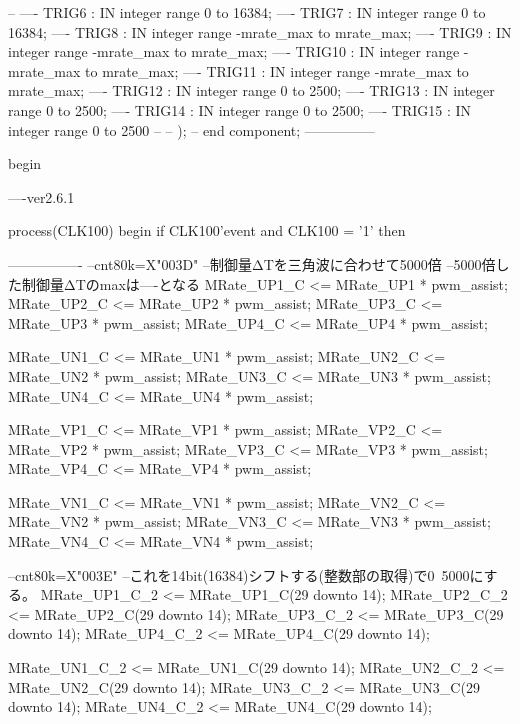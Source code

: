 \begin{mylisting}[language=VHDL,caption=ゲート信号出力モジュール,label=MMC_PWM_GEN_module_VHDL]
--
----			  TRIG6	                           : 	 IN   integer range 0 to 16384; 
----			  TRIG7	                           : 	 IN   integer range 0 to 16384; 
----			  TRIG8	                           : 	 IN   integer range -mrate_max to mrate_max;  
----			  TRIG9	                           : 	 IN   integer range -mrate_max to mrate_max;  
----			  TRIG10	                           : 	 IN   integer range -mrate_max to mrate_max;  
----			  TRIG11	                           : 	 IN   integer range -mrate_max to mrate_max;  
----			  TRIG12	                           :   IN   integer range 0 to 2500;  
----			  TRIG13	                           :   IN   integer range 0 to 2500;  
----			  TRIG14	                           :   IN   integer range 0 to 2500;  
----			  TRIG15	                           :   IN   integer range 0 to 2500
--
--			);
--		end component;
	---------------
	
begin

----ver2.6.1

	process(CLK100)
	begin
		if CLK100'event and CLK100 = '1' then
		
----------------
		--cnt80k=X"003D"
		--制御量ΔTを三角波に合わせて5000倍
		--5000倍した制御量ΔTのmaxは----となる
			MRate_UP1_C <= MRate_UP1 * pwm_assist;
			MRate_UP2_C <= MRate_UP2 * pwm_assist;
			MRate_UP3_C <= MRate_UP3 * pwm_assist;
			MRate_UP4_C <= MRate_UP4 * pwm_assist;
			
			MRate_UN1_C <= MRate_UN1 * pwm_assist;
			MRate_UN2_C <= MRate_UN2 * pwm_assist;
			MRate_UN3_C <= MRate_UN3 * pwm_assist;
			MRate_UN4_C <= MRate_UN4 * pwm_assist;

			MRate_VP1_C <= MRate_VP1 * pwm_assist;
			MRate_VP2_C <= MRate_VP2 * pwm_assist;
			MRate_VP3_C <= MRate_VP3 * pwm_assist;
			MRate_VP4_C <= MRate_VP4 * pwm_assist;
			
			MRate_VN1_C <= MRate_VN1 * pwm_assist;
			MRate_VN2_C <= MRate_VN2 * pwm_assist;
			MRate_VN3_C <= MRate_VN3 * pwm_assist;
			MRate_VN4_C <= MRate_VN4 * pwm_assist;
			
		--cnt80k=X"003E"
		--これを14bit(16384)シフトする(整数部の取得)で0~5000にする。
			MRate_UP1_C_2 <= MRate_UP1_C(29 downto 14);
			MRate_UP2_C_2 <= MRate_UP2_C(29 downto 14);
			MRate_UP3_C_2 <= MRate_UP3_C(29 downto 14);
			MRate_UP4_C_2 <= MRate_UP4_C(29 downto 14);
			
			MRate_UN1_C_2 <= MRate_UN1_C(29 downto 14);
			MRate_UN2_C_2 <= MRate_UN2_C(29 downto 14);
			MRate_UN3_C_2 <= MRate_UN3_C(29 downto 14);
			MRate_UN4_C_2 <= MRate_UN4_C(29 downto 14);


\end{mylisting}

